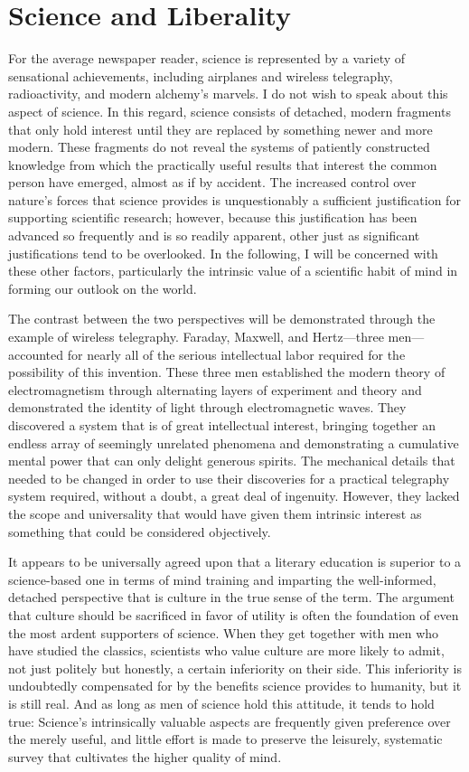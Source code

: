 \documentclass[a4paper,12pt]{book}[2004/02/16]
\theoremstyle{ilemma}
\theoremstyle{itheorem}
\theoremstyle{iother}
\theoremstyle{icorollary}
\theoremstyle{numcorollary}
\theoremstyle{idefinition}
\begin{document}
\chapter{Science and Liberality}
For the average newspaper reader, science is represented by a variety of sensational achievements, including airplanes and wireless telegraphy, radioactivity, and modern alchemy's marvels. I do not wish to speak about this aspect of science. In this regard, science consists of detached, modern fragments that only hold interest until they are replaced by something newer and more modern. These fragments do not reveal the systems of patiently constructed knowledge from which the practically useful results that interest the common person have emerged, almost as if by accident. The increased control over nature's forces that science provides is unquestionably a sufficient justification for supporting scientific research; however, because this justification has been advanced so frequently and is so readily apparent, other just as significant justifications tend to be overlooked. In the following, I will be concerned with these other factors, particularly the intrinsic value of a scientific habit of mind in forming our outlook on the world.

The contrast between the two perspectives will be demonstrated through the example of wireless telegraphy. Faraday, Maxwell, and Hertz—three men—accounted for nearly all of the serious intellectual labor required for the possibility of this invention. These three men established the modern theory of electromagnetism through alternating layers of experiment and theory and demonstrated the identity of light through electromagnetic waves. They discovered a system that is of great intellectual interest, bringing together an endless array of seemingly unrelated phenomena and demonstrating a cumulative mental power that can only delight generous spirits. The mechanical details that needed to be changed in order to use their discoveries for a practical telegraphy system required, without a doubt, a great deal of ingenuity. However, they lacked the scope and universality that would have given them intrinsic interest as something that could be considered objectively.

It appears to be universally agreed upon that a literary education is superior to a science-based one in terms of mind training and imparting the well-informed, detached perspective that is culture in the true sense of the term. The argument that culture should be sacrificed in favor of utility is often the foundation of even the most ardent supporters of science. When they get together with men who have studied the classics, scientists who value culture are more likely to admit, not just politely but honestly, a certain inferiority on their side. This inferiority is undoubtedly compensated for by the benefits science provides to humanity, but it is still real. And as long as men of science hold this attitude, it tends to hold true: Science's intrinsically valuable aspects are frequently given preference over the merely useful, and little effort is made to preserve the leisurely, systematic survey that cultivates the higher quality of mind.
\end{document}
